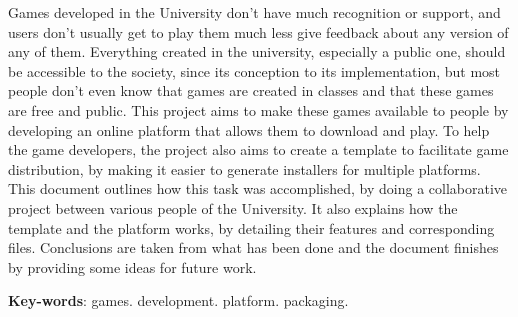 \begin{resumo}[Abstract]
Games developed in the University don't have much recognition or support, and users don't usually get to play them much less give feedback about any version of any of them. Everything created in the university, especially a public one, should be accessible to the society, since its conception to its implementation, but most people don't even know that games are created in classes and that these games are free and public. This project aims to make these games available to people by developing an online platform that allows them to download and play. To help the game developers, the project also aims to create a template to facilitate game distribution, by making it easier to generate installers for multiple platforms. This document outlines how this task was accomplished, by doing a collaborative project between various people of the University. It also explains how the template and the platform works, by detailing their features and corresponding files. Conclusions are taken from what has been done and the document finishes by providing some ideas for future work.

   \vspace{\onelineskip}

   \noindent
   \textbf{Key-words}: games. development. platform. packaging.
\end{resumo}
